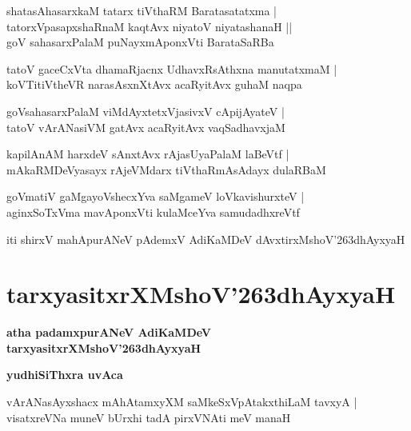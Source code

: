 \documentclass[twoside,12pt,openright]{book}
\def\S{\char'263}
\newcounter{shloka}[chapter]
\def\uvaca#1{\centerline{{\large\textbf{#1}}}}
\begin{document}
\begin{shloka}
shatasAhasarxkaM tatarx tiVthaRM Baratasatatxma |\\
tatorxVpasapxshaRnaM kaqtAvx niyatoV niyatashanaH ||\\
goV sahasarxPalaM puNayxmAponxVti BarataSaRBa
\end{shloka}

\begin{shloka}
tatoV gaceCxVta dhamaRjacnx UdhavxRsAthxna manutatxmaM |\\
koVTitiVtheVR narasAsxnXtAvx acaRyitAvx guhaM naqpa 
\end{shloka}

\begin{shloka}
goVsahasarxPalaM viMdAyxtetxVjasivxV cApijAyateV |\\
tatoV vArANasiVM gatAvx acaRyitAvx vaqSadhavxjaM 
\end{shloka}

\begin{shloka}
kapilAnAM harxdeV sAnxtAvx rAjasUyaPalaM laBeVtf |\\
mAkaRMDeVyasayx rAjeVMdarx tiVthaRmAsAdayx dulaRBaM 
\end{shloka}

\begin{shloka}
goVmatiV gaMgayoVshecxYva saMgameV loVkavishurxteV |\\
aginxSoTxVma mavAponxVti kulaMceYva samudadhxreVtf 
\end{shloka}

\begin{center}
iti shirxV mahApurANeV pAdemxV AdiKaMDeV dAvxtirxMshoV\S dhAyxyaH
\end{center}


\chapter{tarxyasitxrXMshoV\S dhAyxyaH}

\begin{center}
{\LARGE\bfseries atha padamxpurANeV AdiKaMDeV tarxyasitxrXMshoV\S dhAyxyaH}
\end{center}

\uvaca{ yudhiSiThxra uvAca }

\begin{shloka}
vArANasAyxshacx mAhAtamxyXM saMkeSxVpAtakxthiLaM tavxyA |\\
visatxreVNa muneV bUrxhi tadA pirxVNAti meV manaH 
\end{shloka}
\end{document}
